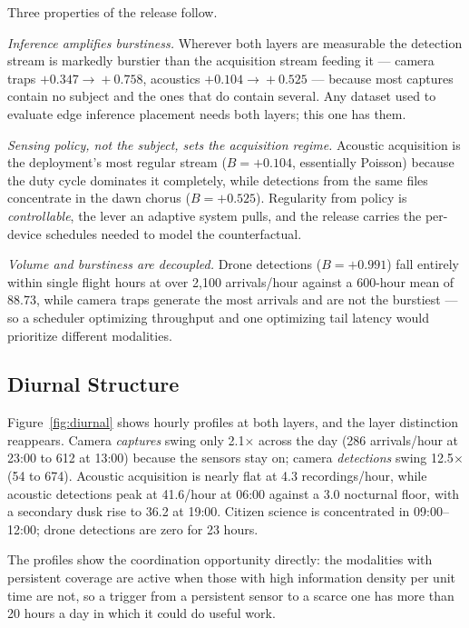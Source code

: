 \documentclass[sigconf]{acmart}
\begin{document}
Three properties of the release follow.

\emph{Inference amplifies burstiness.} Wherever both layers are
measurable the detection stream is markedly burstier than the
acquisition stream feeding it --- camera traps $+0.347\!\to\!+0.758$,
acoustics $+0.104\!\to\!+0.525$ --- because most captures contain no
subject and the ones that do contain several. Any dataset used to
evaluate edge inference placement needs both layers; this one has them.

\emph{Sensing policy, not the subject, sets the acquisition regime.}
Acoustic acquisition is the deployment's most regular stream
($B{=}+0.104$, essentially Poisson) because the duty cycle dominates it
completely, while detections from the same files concentrate in the dawn
chorus ($B{=}+0.525$). Regularity from policy is \emph{controllable},
the lever an adaptive system pulls, and the release carries the
per-device schedules needed to model the counterfactual.

\emph{Volume and burstiness are decoupled.} Drone detections
($B{=}+0.991$) fall entirely within single flight hours at over
2{,}100 arrivals/hour against a 600-hour mean of 88.73, while camera
traps generate the most arrivals and are not the burstiest --- so a
scheduler optimizing throughput and one optimizing tail latency would
prioritize different modalities.

\subsection{Diurnal Structure}

Figure~\ref{fig:diurnal} shows hourly profiles at both layers, and the
layer distinction reappears. Camera \emph{captures} swing only
2.1$\times$ across the day (286 arrivals/hour at 23:00 to 612 at 13:00)
because the sensors stay on; camera \emph{detections} swing
12.5$\times$ (54 to 674). Acoustic acquisition is nearly flat at
4.3 recordings/hour, while acoustic detections peak at 41.6/hour at
06:00 against a 3.0 nocturnal floor, with a secondary dusk rise to 36.2
at 19:00. Citizen science is concentrated in 09:00--12:00; drone
detections are zero for 23 hours.

The profiles show the coordination opportunity directly: the modalities
with persistent coverage are active when those with high information
density per unit time are not, so a trigger from a
persistent sensor to a scarce one has more than 20 hours a day in which
it could do useful work.
\end{document}
